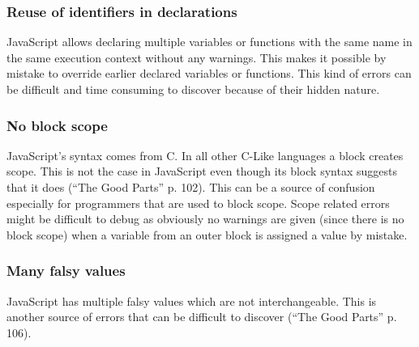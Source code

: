 		\subsubsection{Reuse of identifiers in declarations}
			JavaScript allows declaring multiple variables or functions with the same name in the same execution context without any warnings. This makes it possible by mistake to override earlier declared variables or functions. This kind of errors can be difficult and time consuming to discover because of their hidden nature.

		\subsubsection{No block scope}
			JavaScript’s syntax comes from C. In all other C-Like languages a block creates scope. This is not the case in JavaScript even though its block syntax suggests that it does (“The Good Parts” p. 102). This can be a source of confusion especially for programmers that are used to block scope. Scope related errors might be difficult to debug as obviously no warnings are given (since there is no block scope) when a variable from an outer block is assigned a value by mistake.

		\subsubsection{Many falsy values}
			JavaScript has multiple falsy values which are not interchangeable. This is another source of errors that can be difficult to discover (“The Good Parts” p. 106).


